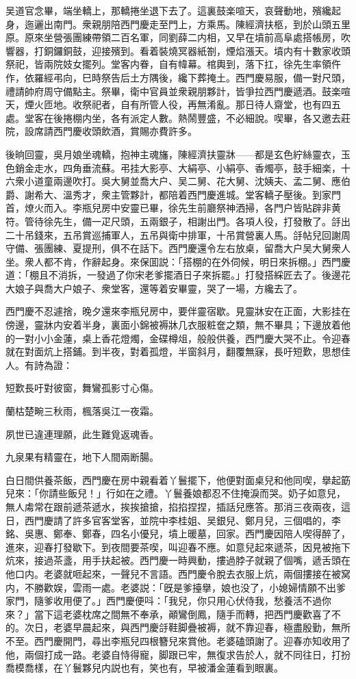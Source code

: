 吴道官念畢，端坐轎上，那轎捲坐退下去了。這裏鼓楽喧天，哀聲動地，殯纔起身，迤邐出南門。衆親朋陪西門慶走至門上，方乘馬。陳經濟扶柩，到於山頭五里原。原來坐營張團練帶領二百名軍，同劉薛二内相，又早在墳前高阜處搭帳房，吹響器，打銅鑼銅鼓，迎接殯到。看着裝燒冥器紙劄，煙焰漲天。墳内有十數家收頭祭祀，皆兩院妓女擺列。堂客内眷，自有幃幕。棺輿到，落下扛，徐先生率領仵作，依羅經弔向，巳時祭告后土方隅後，纔下葬掩土。西門慶易服，備一對尺頭，禮請帥府周守備點主。祭畢，衛中官員並衆親朋夥計，皆爭拉西門慶遞酒。鼓楽喧天，煙火匝地。收祭祀者，自有所管人役，再無淆亂。那日待人齋堂，也有四五處。堂客在後捲棚内坐，各有派定人數。熱鬧豐盛，不必細說。喫畢，各又邀去莊院，設席請西門慶收頭飲酒，賞賜亦費許多。

後晌回靈，吳月娘坐魂轎，抱神主魂旛，陳經濟扶靈牀——都是玄色紵絲靈衣，玉色銷金走水，四角垂流蘇。弔挂大影亭、大絹亭、小絹亭、香燭亭，鼓手細楽，十六衆小道童兩邊吹打。吳大舅並喬大户、吴二舅、花大舅、沈姨夫、孟二舅、應伯爵、謝希大、溫秀才，衆主管夥計，都陪着西門慶進城。堂客轎子壓後。到家門首，燎火而入。李瓶兒房中安靈已畢，徐先生前廳祭神洒掃，各門户皆貼辟非黄符。管待徐先生，備一疋尺頭，五兩銀子，相謝出門。各項人役，打發散了。㧱出二十吊錢來，五吊賞巡捕軍人，五吊與衛中排軍，十吊賞營裏人馬。㧱帖兒回謝周守備、張團練、夏提刑，俱不在話下。西門慶還令左右放桌，留喬大户吴大舅衆人坐。衆人都不肯，作辭起身。來保囬説：「搭棚的在外伺候，明日來拆棚。」西門慶道：「棚且不消拆，一發過了你宋老爹擺酒日子來拆罷。」打發搭綵匠去了。後邊花大娘子與喬大户娘子、衆堂客，還等着安畢靈，哭了一場，方纔去了。

西門慶不忍遽捨，晚夕還來李瓶兒房中，要伴靈宿歇。見靈牀安在正面，大影挂在傍邊，靈牀内安着半身，裏面小錦被褥牀几衣服粧奩之類，無不畢具；下邊放着他的一對小小金蓮，桌上香花燈燭，金碟樽俎，般般供養，西門慶大哭不止。令迎春就在對面炕上搭鋪。到半夜，對着孤燈，半窗斜月，翻覆無寐，長吁短歎，思想佳人。有詩為證：

\begin{myquote}
短歎長吁對彼窗，舞鸞孤影寸心傷。

蘭枯楚畹三秋雨，楓落吳江一夜霜。

夙世已違連理願，此生難覓返魂香。

九泉果有精靈在，地下人間兩断腸。
\end{myquote}

白日間供養茶飯，西門慶在房中親看着丫鬟擺下，他便對面桌兒和他同喫，擧起筯兒來：「你請些飯兒！」行如在之禮。丫鬟養娘都忍不住掩淚而哭。奶子如意兒，無人䖏常在跟前遞茶遞水，挨挨搶搶，掐掐捏捏，插話兒應答。那消三夜兩夜，這日，西門慶請了許多官客堂客，並院中李桂姐、吴銀兒、鄭月兒，三個唱的，李銘、吳惠、鄭奉、鄭春，四名小優兒，墳上暖墓，回家。西門慶因陪人喫得醉了，進來，迎春打發歇下。到夜間要茶喫，叫迎春不應。如意兒起來遞茶，因見被拖下炕來，接過茶盞，用手扶起被。西門慶一時興動，摟過脖子就親了個嘴，遞舌頭在他口内。老婆就咂起來，一聲兒不言語。西門慶令脫去衣服上炕，兩個摟接在被窝内，不勝歡娱，雲雨一處。老婆説：「旣是爹擡擧，娘也没了，小媳婦情願不出爹家門，隨爹收用便了。」西門慶便呌：「我兒，你只用心伏侍我，愁養活不過你來？」當下這老婆枕席之間無不奉承，顚鸞倒鳳，隨手而轉，把西門慶歡喜了不的。次日，老婆早晨起來，與西門慶㧱鞋脚疊被褥，就不靠迎春，極盡殷勤，無所不至。西門慶開門，尋出李瓶兒四根簪兒來賞他。老婆磕頭謝了。迎春亦知收用了他，兩個打成一路。老婆自恃得寵，脚跟已牢，無復求告於人，就不同往日，打扮喬模喬樣，在丫鬟夥兒内説也有，笑也有，早被潘金蓮看到眼裏。

